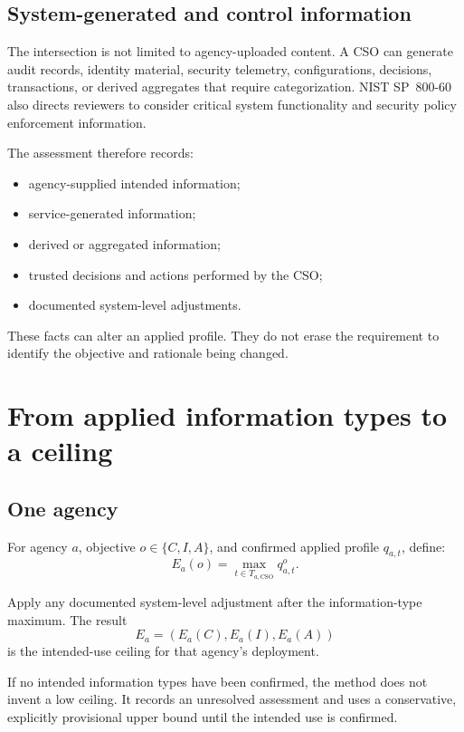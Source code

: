 \documentclass[11pt]{article}
\begin{document}
\subsection{System-generated and control information}

The intersection is not limited to agency-uploaded content. A CSO can generate
audit records, identity material, security telemetry, configurations, decisions,
transactions, or derived aggregates that require categorization. NIST SP~800-60
also directs reviewers to consider critical system functionality and security
policy enforcement information.

The assessment therefore records:

\begin{itemize}[leftmargin=1.5em]
\item agency-supplied intended information;
\item service-generated information;
\item derived or aggregated information;
\item trusted decisions and actions performed by the CSO;
\item documented system-level adjustments.
\end{itemize}

These facts can alter an applied profile. They do not erase the requirement to
identify the objective and rationale being changed.

\section{From applied information types to a ceiling}

\subsection{One agency}

For agency $a$, objective $o\in\{C,I,A\}$, and confirmed applied profile
$q_{a,t}$, define:
\begin{equation}
E_a(o)=\max_{t\in T_{a,\mathrm{CSO}}}q_{a,t}^o.
\label{eq:agency-ceiling}
\end{equation}

Apply any documented system-level adjustment after the information-type maximum.
The result
\[
E_a=(E_a(C),E_a(I),E_a(A))
\]
is the intended-use ceiling for that agency's deployment.

If no intended information types have been confirmed, the method does not invent a
low ceiling. It records an unresolved assessment and uses a conservative,
explicitly provisional upper bound until the intended use is confirmed.
\end{document}
